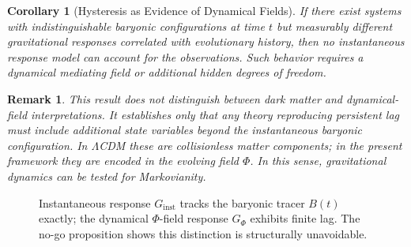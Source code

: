 \documentclass[11pt, a4paper, twocolumn]{article}
\newtheorem{corollary}[definition]{Corollary}
\newtheorem{remark}[definition]{Remark}
\begin{document}
\begin{corollary}[Hysteresis as Evidence of Dynamical Fields]
If there exist systems with indistinguishable baryonic configurations at time $t$
but measurably different gravitational responses correlated with evolutionary
history, then no instantaneous response model can account for the observations.
Such behavior requires a dynamical mediating field or additional hidden degrees
of freedom.
\end{corollary}

\begin{remark}
This result does not distinguish between dark matter and dynamical-field
interpretations. It establishes only that any theory reproducing persistent
lag must include additional state variables beyond the instantaneous baryonic
configuration. In $\Lambda$CDM these are collisionless matter components; in
the present framework they are encoded in the evolving field $\Phi$.
In this sense, gravitational dynamics can be tested for Markovianity.
\end{remark}

\begin{figure}[ht]
\centering
{}
\caption{Instantaneous response $G_{\mathrm{inst}}$ tracks the baryonic tracer $B(t)$ exactly; the dynamical $\Phi$-field response $G_\Phi$ exhibits finite lag. The no-go proposition shows this distinction is structurally unavoidable.}
\end{figure}
\end{document}
